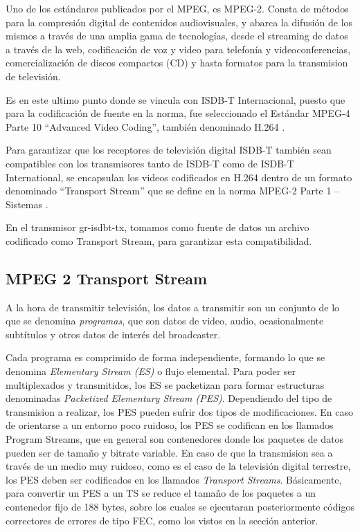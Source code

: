 Uno de los estándares publicados por el MPEG, es MPEG-2. Consta de métodos para la compresión digital de contenidos audiovisuales,  y abarca la difusión de los mismos a través de una amplia gama de tecnologías, desde el streaming de datos a través de la web, codificación de voz y video para telefonía y videoconferencias, comercialización de discos compactos (CD) y hasta formatos para la transmision de televisión. 

Es en este ultimo punto donde se vincula con ISDB-T Internacional, puesto que para la codificación de fuente en la norma, fue seleccionado el Estándar MPEG-4 Parte 10 “Advanced Video Coding”, también denominado H.264 \cite{mpeg4_10}.

Para garantizar que los receptores de televisión digital ISDB-T también sean compatibles con los transmisores tanto de ISDB-T como de ISDB-T International, se encapsulan los videos codificados en H.264 dentro de un formato denominado “Transport Stream” que se define en la norma MPEG-2 Parte 1 – Sistemas \cite{mpeg2_1}.

En el transmisor gr-isdbt-tx, tomamos como fuente de datos un archivo codificado como Transport Stream, para garantizar esta compatibilidad.

	\subsection{MPEG 2 Transport Stream}
	
	A la hora de transmitir televisión, los datos a transmitir son un conjunto de lo que se denomina \textit{programas}, que son datos de video, audio, ocasionalmente subtítulos y otros datos de interés del broadcaster.  
	
	Cada programa es comprimido de forma independiente, formando lo que se denomina \textit{Elementary Stream (ES)} o flujo elemental. Para poder ser multiplexados y transmitidos, los ES se packetizan para formar estructuras denominadas \textit{Packetized Elementary Stream (PES)}. Dependiendo del tipo de transmision a realizar, los PES pueden sufrir dos tipos de modificaciones. En caso de orientarse a un entorno poco ruidoso, los PES se codifican en los llamados Program Streams, que en general son contenedores donde los paquetes de datos pueden ser de tamaño y bitrate variable. En caso de que la transmision sea a través de un medio muy ruidoso, como es el caso de la televisión digital terrestre, los PES deben ser codificados en los llamados \textit{Transport Streams}. Básicamente, para convertir un PES a un TS se reduce el tamaño de los paquetes a un contenedor fijo de 188 bytes, sobre los cuales se ejecutaran posteriormente códigos correctores de errores de tipo FEC, como los vistos en la sección anterior.
	
